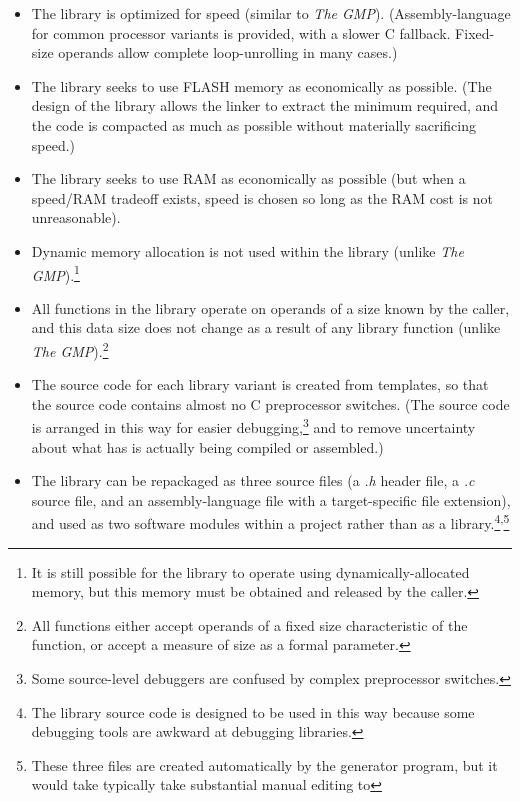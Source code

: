 \begin{itemize}
\item The library is optimized for speed (similar to \emph{The GMP}).
      (Assembly-language for common
      processor variants is provided, with a slower C fallback.  Fixed-size operands
      allow complete loop-unrolling in many cases.)
\item The library seeks to use FLASH memory as economically as possible.  (The design
      of the library allows the linker to extract the minimum required, and the code is
      compacted as much as possible without materially sacrificing speed.)
\item The library seeks to use RAM as economically as possible (but when a speed/RAM
      tradeoff exists, speed is chosen so long as the RAM cost is not unreasonable).
\item Dynamic memory allocation is not used within the library
      (unlike \emph{The GMP}).\footnote{It is still
      possible for the library to operate using dynamically-allocated memory,
      but this memory must be obtained and released by the caller.}
\item All functions in the library operate on operands of a size known by the
      caller, and this data size does not change as a result of any
      library function (unlike \emph{The GMP}).\footnote{All functions
      either accept operands of a fixed
      size characteristic of the function, or accept a measure of size
      as a formal parameter.}
\item The source code for each library variant is created from templates,
      so that the source code contains almost no C preprocessor
      switches.  (The source code is arranged in this way for
      easier debugging,\footnote{Some source-level debuggers are
      confused by complex preprocessor switches.} and to remove uncertainty about what has
      is actually being compiled or assembled.)
\item The library can be repackaged as three source files (a \emph{.h} header file, a \emph{.c}
      source file, and an assembly-language file with a target-specific file extension),
      and used as two software modules within a project rather than as a library.\footnote{The
      library source code is designed to be used in this way because some debugging tools
      are awkward at debugging libraries.}\textsuperscript{,}\footnote{These three files are created automatically
      by the generator program, but it would take typically take substantial manual editing to
}
\end{itemize}

